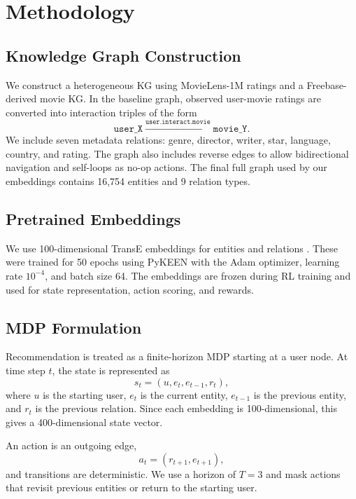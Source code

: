 \documentclass{article}
\begin{document}
\section{Methodology}

\subsection{Knowledge Graph Construction}

We construct a heterogeneous KG using MovieLens-1M ratings and a Freebase-derived movie KG. In the baseline graph, observed user-movie ratings are converted into interaction triples of the form
\[
\texttt{user\_X} \xrightarrow{\texttt{user.interact.movie}} \texttt{movie\_Y}.
\]
We include seven metadata relations: genre, director, writer, star, language, country, and rating. The graph also includes reverse edges to allow bidirectional navigation and self-loops as no-op actions. The final full graph used by our embeddings contains 16,754 entities and 9 relation types.

\subsection{Pretrained Embeddings}

We use 100-dimensional TransE embeddings for entities and relations \citep{bordes2013transe}. These were trained for 50 epochs using PyKEEN with the Adam optimizer, learning rate $10^{-4}$, and batch size 64. The embeddings are frozen during RL training and used for state representation, action scoring, and rewards.

\subsection{MDP Formulation}

Recommendation is treated as a finite-horizon MDP starting at a user node. At time step $t$, the state is represented as
\begin{equation}
    s_t = (u, e_t, e_{t-1}, r_t),
\end{equation}
where $u$ is the starting user, $e_t$ is the current entity, $e_{t-1}$ is the previous entity, and $r_t$ is the previous relation. Since each embedding is 100-dimensional, this gives a 400-dimensional state vector.

An action is an outgoing edge,
\begin{equation}
    a_t = (r_{t+1}, e_{t+1}),
\end{equation}
and transitions are deterministic. We use a horizon of $T=3$ and mask actions that revisit previous entities or return to the starting user.
\end{document}

